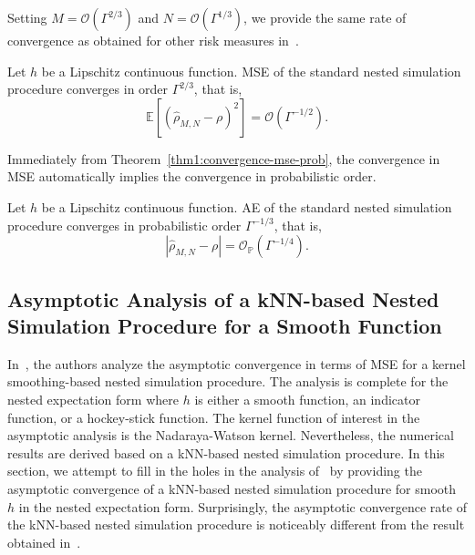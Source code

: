 Setting $M = \mathcal{O}(\Gamma^{2/3})$ and $N = \mathcal{O}(\Gamma^{1/3})$, we provide the same rate of convergence as obtained for other risk measures in~\cite{gordy2010nested}.

\begin{theorem}
    Let $h$ be a Lipschitz continuous function. 
    MSE of the standard nested simulation procedure converges in order $\Gamma^{2/3}$, that is,
    $$\mathbb{E} \left[ \left( \hat{\rho}_{M, N} - \rho \right)^2 \right] = \mathcal{O}(\Gamma^{-1/2}).$$
\end{theorem}

Immediately from Theorem~\ref{thm1:convergence-mse-prob}, the convergence in MSE automatically implies the convergence in probabilistic order.

\begin{corollary}
    Let $h$ be a Lipschitz continuous function. AE of the standard nested simulation procedure converges in probabilistic order $\Gamma^{-1/3}$, that is,
    $$\left| \hat{\rho}_{M, N} - \rho \right| = \mathcal{O}_\mathbb{P}(\Gamma^{-1/4}).$$
\end{corollary}

\subsection{Asymptotic Analysis of a kNN-based Nested Simulation Procedure for a Smooth Function}

In~\cite{hong2017kernel}, the authors analyze the asymptotic convergence in terms of MSE for a kernel smoothing-based nested simulation procedure.
The analysis is complete for the nested expectation form where $h$ is either a smooth function, an indicator function, or a hockey-stick function.
The kernel function of interest in the asymptotic analysis is the Nadaraya-Watson kernel.
Nevertheless, the numerical results are derived based on a kNN-based nested simulation procedure.
In this section, we attempt to fill in the holes in the analysis of~\cite{hong2017kernel} by providing the asymptotic convergence of a kNN-based nested simulation procedure for smooth $h$ in the nested expectation form.
Surprisingly, the asymptotic convergence rate of the kNN-based nested simulation procedure is noticeably different from the result obtained in~\cite{hong2017kernel}.

